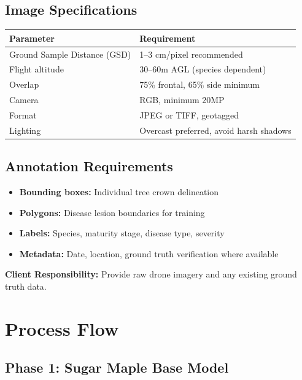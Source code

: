 \documentclass[11pt,a4paper]{article}
\begin{document}
\subsection{Image Specifications}

\begin{center}
\begin{tabular}{ll}
\toprule
\textbf{Parameter} & \textbf{Requirement} \\
\midrule
Ground Sample Distance (GSD) & 1--3 cm/pixel recommended \\
Flight altitude & 30--60m AGL (species dependent) \\
Overlap & 75\% frontal, 65\% side minimum \\
Camera & RGB, minimum 20MP \\
Format & JPEG or TIFF, geotagged \\
Lighting & Overcast preferred, avoid harsh shadows \\
\bottomrule
\end{tabular}
\end{center}

\subsection{Annotation Requirements}

\begin{itemize}[leftmargin=*]
\item \textbf{Bounding boxes:} Individual tree crown delineation
\item \textbf{Polygons:} Disease lesion boundaries for training
\item \textbf{Labels:} Species, maturity stage, disease type, severity
\item \textbf{Metadata:} Date, location, ground truth verification where available
\end{itemize}

\textbf{Client Responsibility:} Provide raw drone imagery and any existing ground truth data. 

\section{Process Flow}

\subsection{Phase 1: Sugar Maple Base Model}
\end{document}
